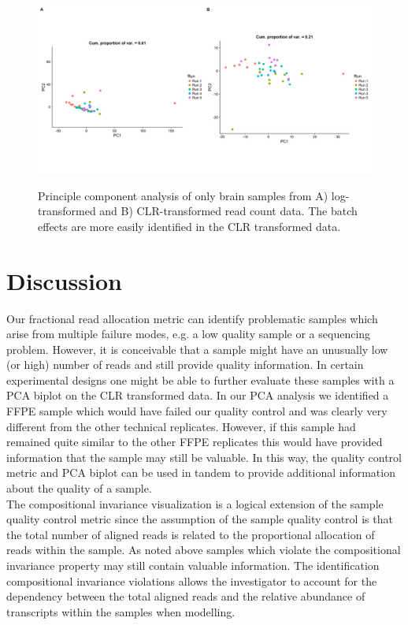\documentclass{article}\usepackage[]{graphicx}\usepackage[]{color}
\theoremstyle{definition}
\begin{document}
\begin{figure}
\includegraphics[scale=0.4]{./Figures/IO_PCA_Brain_logRaw_CLR}
\label{rawPCAbrain}
\caption{Principle component analysis of only brain samples from A) log-transformed and B) CLR-transformed read count data. The batch effects are more easily identified in the CLR transformed data.}
\end{figure}



\FloatBarrier
\section{Discussion}

Our fractional read allocation metric can identify problematic samples which arise from multiple failure modes, e.g. a low quality sample or a sequencing problem.  However, it is conceivable that a sample might have an unusually low (or high) number of reads and still provide quality information.  In certain experimental designs one might be able to further evaluate these samples with a PCA biplot on the CLR transformed data. In our PCA analysis we identified a FFPE sample which would have failed our quality control and was clearly very different from the other technical replicates.  However, if this sample had remained quite similar to the other FFPE replicates this would have provided information that the sample may still be valuable.  In this way, the quality control metric and PCA biplot can be used in tandem to provide additional information about the quality of a sample.\\

The compositional invariance visualization is a logical extension of the sample quality control metric since the assumption of the sample quality control is that the total number of aligned reads is related to the proportional allocation of reads within the sample.  As noted above samples which violate the compositional invariance property may still contain valuable information.  The identification compositional invariance violations allows the investigator to account for the dependency between the total aligned reads and the relative abundance of transcripts within the samples when modelling.
\end{document}
